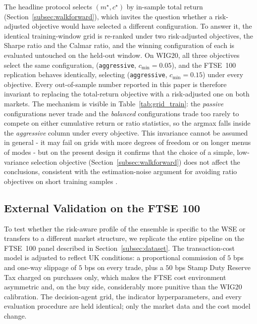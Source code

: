 \documentclass{ieeeaccess}
\newcommand{\ObjSharpeMode}{\texttt{aggressive}}
\newcommand{\ObjSharpeMinConf}{\ensuremath{0.05}}
\newcommand{\FtseObjSharpeMode}{\texttt{aggressive}}
\newcommand{\FtseObjSharpeMinConf}{\ensuremath{0.15}}
\begin{document}
The headline protocol selects $(m^\star, c^\star)$ by in-sample total return (Section~\ref{subsec:walkforward}), which invites the question whether a risk-adjusted objective would have selected a different configuration. To answer it, the identical training-window grid is re-ranked under two risk-adjusted objectives, the Sharpe ratio and the Calmar ratio, and the winning configuration of each is evaluated untouched on the held-out window. On WIG20, all three objectives select the same configuration, (\ObjSharpeMode{}, $c_{\min} = \ObjSharpeMinConf{}$), and the FTSE~100 replication behaves identically, selecting (\FtseObjSharpeMode{}, $c_{\min} = \FtseObjSharpeMinConf{}$) under every objective. Every out-of-sample number reported in this paper is therefore invariant to replacing the total-return objective with a risk-adjusted one on both markets. The mechanism is visible in Table~\ref{tab:grid_train}: the \emph{passive} configurations never trade and the \emph{balanced} configurations trade too rarely to compete on either cumulative return or ratio statistics, so the argmax falls inside the \emph{aggressive} column under every objective. This invariance cannot be assumed in general - it may fail on grids with more degrees of freedom or on longer menus of modes - but on the present design it confirms that the choice of a simple, low-variance selection objective (Section~\ref{subsec:walkforward}) does not affect the conclusions, consistent with the estimation-noise argument for avoiding ratio objectives on short training samples \cite{lo2002}.

\subsection{External Validation on the FTSE 100}
\label{subsec:ftse}

To test whether the risk-aware profile of the ensemble is specific to the WSE or transfers to a different market structure, we replicate the entire pipeline on the FTSE~100 panel described in Section~\ref{subsec:dataset}. The transaction-cost model is adjusted to reflect UK conditions: a proportional commission of $5$ bps and one-way slippage of $5$ bps on every trade, plus a $50$ bps Stamp Duty Reserve Tax charged on purchases only, which makes the FTSE cost environment asymmetric and, on the buy side, considerably more punitive than the WIG20 calibration. The decision-agent grid, the indicator hyperparameters, and every evaluation procedure are held identical; only the market data and the cost model change.
\end{document}
